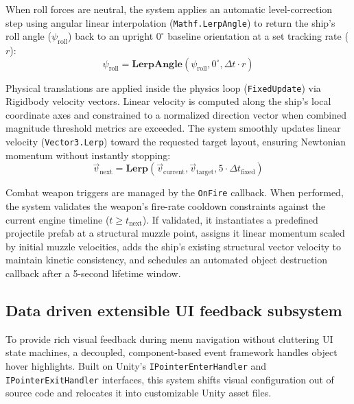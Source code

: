 \documentclass[12pt]{report}
\begin{document}
When roll forces are neutral, the system applies an automatic level-correction step using angular linear interpolation (\texttt{Mathf.LerpAngle}) to return the ship's roll angle ($\psi_{\text{roll}}$) back to an upright $0^\circ$ baseline orientation at a set tracking rate ($r$):
\begin{equation}
\psi_{\text{roll}} = \mathbf{LerpAngle}(\psi_{\text{roll}}, 0^\circ, \Delta t \cdot r)
\end{equation}

Physical translations are applied inside the physics loop (\texttt{FixedUpdate}) via Rigidbody velocity vectors. Linear velocity is computed along the ship's local coordinate axes and constrained to a normalized direction vector when combined magnitude threshold metrics are exceeded. The system smoothly updates linear velocity (\texttt{Vector3.Lerp}) toward the requested target layout, ensuring Newtonian momentum without instantly stopping:
\begin{equation}
\vec{v}_{\text{next}} = \mathbf{Lerp}(\vec{v}_{\text{current}}, \vec{v}_{\text{target}}, 5 \cdot \Delta t_{\text{fixed}})
\end{equation}

Combat weapon triggers are managed by the \texttt{OnFire} callback. When performed, the system validates the weapon's fire-rate cooldown constraints against the current engine timeline ($t \ge t_{\text{next}}$). If validated, it instantiates a predefined projectile prefab at a structural muzzle point, assigns it linear momentum scaled by initial muzzle velocities, adds the ship's existing structural vector velocity to maintain kinetic consistency, and schedules an automated object destruction callback after a 5-second lifetime window.

\subsection{Data driven extensible UI feedback subsystem}

To provide rich visual feedback during menu navigation without cluttering UI state machines, a decoupled, component-based event framework handles object hover highlights. Built on Unity's \texttt{IPointerEnterHandler} and \texttt{IPointerExitHandler} interfaces, this system shifts visual configuration out of source code and relocates it into customizable Unity asset files.
\end{document}
